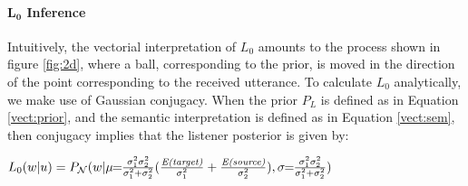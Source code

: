 \documentclass[9pt,twocolumn,twoside,lineno]{pnas-new}
\begin{document}
{	\paragraph{$\mathbf{L_0}$ Inference}
	Intuitively, the vectorial interpretation of $L_0$ amounts to the process shown in figure \ref{fig:2d}, where a ball, corresponding to the prior, is moved in the direction of the point corresponding to the received utterance. To calculate $L_0$ analytically, we make use of Gaussian conjugacy. When the prior $P_L$ is defined as in Equation \ref{vect:prior}, and the semantic interpretation is defined as in Equation \ref{vect:sem}, then conjugacy implies that the listener posterior is given by:

	 \begin{examples}
	\item $L_0(w|u)=P_{\mathcal{N}}(w\vert\mu\! \! =\! \! \frac{\sigma_1^2 \sigma_2^2}{\sigma_1^2+\sigma_2^2}(\frac{{\textrm{\emph{E(target)}}}}{\sigma_1^2}+\frac{{\textrm{\emph{E(source)}}}}{\sigma_2^2}), \sigma \! \!=\! \! \frac{\sigma_1^2 \sigma_2^2}{\sigma_1^2+\sigma_2^2})$  \label{eq:L0-inference}
	 \end{examples}
















}
\end{document}
